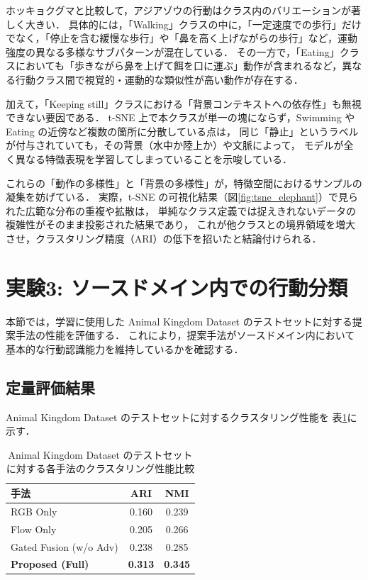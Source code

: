 ホッキョクグマと比較して，アジアゾウの行動はクラス内のバリエーションが著しく大きい．
具体的には，「Walking」クラスの中に，「一定速度での歩行」だけでなく，「停止を含む緩慢な歩行」や「鼻を高く上げながらの歩行」など，運動強度の異なる多様なサブパターンが混在している．
その一方で，「Eating」クラスにおいても「歩きながら鼻を上げて餌を口に運ぶ」動作が含まれるなど，異なる行動クラス間で視覚的・運動的な類似性が高い動作が存在する．

加えて，「Keeping still」クラスにおける「背景コンテキストへの依存性」も無視できない要因である．
t-SNE 上で本クラスが単一の塊にならず，Swimming や Eating の近傍など複数の箇所に分散している点は，
同じ「静止」というラベルが付与されていても，その背景（水中か陸上か）や文脈によって，
モデルが全く異なる特徴表現を学習してしまっていることを示唆している．

これらの「動作の多様性」と「背景の多様性」が，特徴空間におけるサンプルの凝集を妨げている．
実際，t-SNE の可視化結果（図\ref{fig:tsne_elephant}）で見られた広範な分布の重複や拡散は，
単純なクラス定義では捉えきれないデータの複雑性がそのまま投影された結果であり，
これが他クラスとの境界領域を増大させ，クラスタリング精度（ARI）の低下を招いたと結論付けられる．

\section{実験3: ソースドメイン内での行動分類}
本節では，学習に使用した Animal Kingdom Dataset のテストセットに対する提案手法の性能を評価する．
これにより，提案手法がソースドメイン内において
基本的な行動認識能力を維持しているかを確認する．

\subsection{定量評価結果}
Animal Kingdom Dataset のテストセットに対するクラスタリング性能を
表\ref{tab:clustering_results_ak}に示す．

\begin{table}[t]
  \centering
  \caption{Animal Kingdom Dataset のテストセットに対する各手法のクラスタリング性能比較}
  \label{tab:clustering_results_ak}
  \begin{tabular}{lcc}
    \hline
    手法 & ARI & NMI \\
    \hline \hline
    RGB Only & 0.160 & 0.239 \\
    Flow Only & 0.205 & 0.266 \\
    Gated Fusion (w/o Adv) & 0.238 & 0.285 \\
    \textbf{Proposed (Full)} & \textbf{0.313} & \textbf{0.345} \\
    \hline
  \end{tabular}
\end{table}

